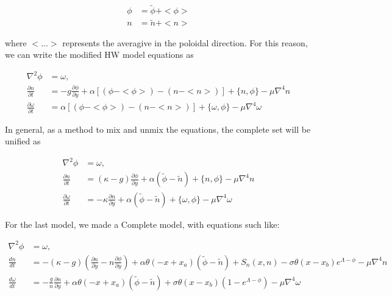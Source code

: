 \documentclass{hitec} %
\begin{document}
\begin{subequations}
\begin{align}
\phi & = \tilde{\phi} + <\phi> \\
n & = \tilde{n} + <n>
\end{align}
\end{subequations}

where $<...>$ represents the averagive in the poloidal direction. For this reason, we can write the modified HW model equations as 

\begin{subequations}
\begin{align}
 \nabla^2 \phi & =  \omega, \quad \\
 \frac{\partial n}{\partial t}    & = - g \frac{\partial \phi}{\partial y} + \alpha [(\phi - <\phi>) - (n - <n>)]
 + \{n, \phi\} - \mu \nabla^4 n \\
  \frac{\partial \omega}{\partial t} & = \alpha [(\phi - <\phi>) - (n - <n>)]  + \{ \omega, \phi\}
  - \mu\nabla^4\omega
\end{align}
\end{subequations}


In general, as a method to mix and unmix the equations, the complete set will be unified as

\begin{subequations}
\begin{align}
 \nabla^2 \phi & =  \omega, \quad \\
 \frac{\partial n}{\partial t}     & = (\kappa - g) \frac{\partial \phi}{\partial y} + \alpha (\tilde{\phi} - \tilde{n})
 + \{n, \phi\} - \mu \nabla^4 n \\
  \frac{\partial \omega}{\partial t} & =  - \kappa\frac{\partial n}{\partial y} + \alpha ( \tilde{\phi} - \tilde{n}) + \{ \omega, \phi\}
- \mu\nabla^4\omega
\end{align}
\end{subequations}


For the last model, we made a Complete model, with equations such like:

\begin{subequations}
\begin{align}
 \nabla^2 \phi & =  \omega, \quad  \\
 \frac{d n}{d t} & = -(\kappa - g) \left(\frac{\partial n}{\partial y} - n \frac{\partial \phi}{\partial y}\right) + \alpha\theta(- x + x_a) (\tilde{\phi} - \tilde{n}) + S_n(x, n) - \sigma\theta(x - x_b) e^{\Lambda - \phi} - \mu \nabla^4 n  \\
  \frac{d \omega}{d  t} & =  - \frac{g}{n}\frac{\partial n}{\partial y} + \alpha\theta(- x + x_a) ( \tilde{\phi} - \tilde{n}) +\sigma\theta(x - x_b)\left(1-e^{\Lambda-\phi}\right) - \mu\nabla^4\omega
\end{align}
\end{subequations}
\end{document}

